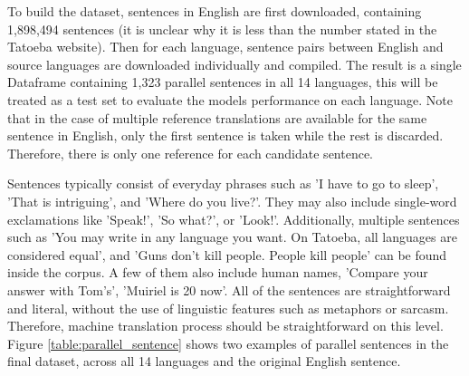 \documentclass[a4paper]{article}
\begin{document}
To build the dataset, sentences in English are first downloaded, containing 1,898,494 sentences (it is unclear why it is less than the number stated in the Tatoeba website). Then for each language, sentence pairs between English and source languages are downloaded individually and compiled. The result is a single Dataframe containing 1,323 parallel sentences in all 14 languages, this will be treated as a test set to evaluate the models performance on each language. Note that in the case of multiple reference translations are available for the same sentence in English, only the first sentence is taken while the rest is discarded. Therefore, there is only one reference for each candidate sentence.

Sentences typically consist of everyday phrases such as 'I have to go to sleep', 'That is intriguing', and 'Where do you live?'. They may also include single-word exclamations like 'Speak!', 'So what?', or 'Look!'. Additionally, multiple sentences such as 'You may write in any language you want. On Tatoeba, all languages are considered equal', and 'Guns don't kill people. People kill people' can be found inside the corpus. A few of them also include human names, 'Compare your answer with Tom's', 'Muiriel is 20 now'. All of the sentences are straightforward and literal, without the use of linguistic features such as metaphors or sarcasm. Therefore, machine translation process should be straightforward on this level. Figure \ref{table:parallel_sentence} shows two examples of parallel sentences in the final dataset, across all 14 languages and the original English sentence.
\end{document}
